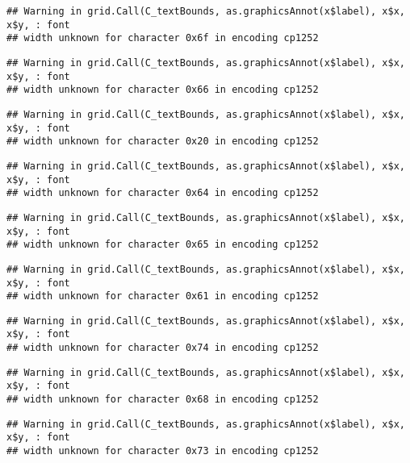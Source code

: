 \documentclass[
]{article}
\begin{document}
\begin{verbatim}
## Warning in grid.Call(C_textBounds, as.graphicsAnnot(x$label), x$x, x$y, : font
## width unknown for character 0x6f in encoding cp1252
\end{verbatim}

\begin{verbatim}
## Warning in grid.Call(C_textBounds, as.graphicsAnnot(x$label), x$x, x$y, : font
## width unknown for character 0x66 in encoding cp1252
\end{verbatim}

\begin{verbatim}
## Warning in grid.Call(C_textBounds, as.graphicsAnnot(x$label), x$x, x$y, : font
## width unknown for character 0x20 in encoding cp1252
\end{verbatim}

\begin{verbatim}
## Warning in grid.Call(C_textBounds, as.graphicsAnnot(x$label), x$x, x$y, : font
## width unknown for character 0x64 in encoding cp1252
\end{verbatim}

\begin{verbatim}
## Warning in grid.Call(C_textBounds, as.graphicsAnnot(x$label), x$x, x$y, : font
## width unknown for character 0x65 in encoding cp1252
\end{verbatim}

\begin{verbatim}
## Warning in grid.Call(C_textBounds, as.graphicsAnnot(x$label), x$x, x$y, : font
## width unknown for character 0x61 in encoding cp1252
\end{verbatim}

\begin{verbatim}
## Warning in grid.Call(C_textBounds, as.graphicsAnnot(x$label), x$x, x$y, : font
## width unknown for character 0x74 in encoding cp1252
\end{verbatim}

\begin{verbatim}
## Warning in grid.Call(C_textBounds, as.graphicsAnnot(x$label), x$x, x$y, : font
## width unknown for character 0x68 in encoding cp1252
\end{verbatim}

\begin{verbatim}
## Warning in grid.Call(C_textBounds, as.graphicsAnnot(x$label), x$x, x$y, : font
## width unknown for character 0x73 in encoding cp1252
\end{verbatim}
\end{document}
